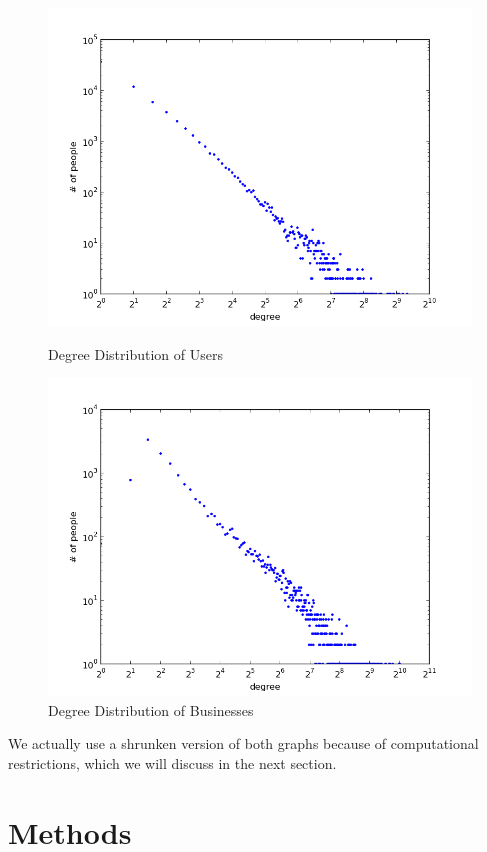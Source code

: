 \documentclass[10pt]{article}
\begin{document}
\begin{figure}[ht]
\includegraphics[scale=.4]{user_degree_distribution.png} 
\caption{Degree Distribution of Users}
\label{fig:bipartite_degree_user}
\endminipage\hfill
{}
\includegraphics[scale=.4]{biz_degree_distribution.png}
\caption{Degree Distribution of Businesses}
\label{fig:bipartite_degree_biz}
\endminipage\hfill
\end{figure}

We actually use a shrunken version of both graphs because of computational restrictions, which we will discuss in the next section.

\section{Methods}
\end{document}
